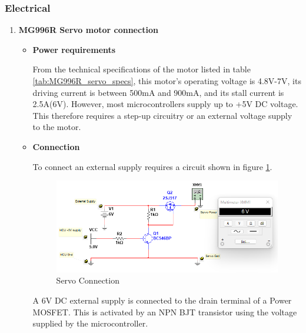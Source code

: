 \subsubsection{Electrical}
\begin{enumerate}
    \item \textbf{MG996R Servo motor connection}
    \par
    \begin{itemize}
        \item \textbf{Power requirements}
        \par
        From the technical specifications of the motor listed in table \ref{tab:MG996R_servo_specs}, this motor's operating voltage is 4.8V-7V, its driving current is between 500mA and 900mA, and its stall current is 2.5A(6V). However, most microcontrollers supply up to +5V DC voltage. This therefore requires a step-up circuitry or an external voltage supply to the  motor.
        \item \textbf{Connection}
        \par
        To connect an external supply requires a circuit shown in figure \ref{fig:servo_connection}.
        \begin{figure}[H]
            \centering
            \includegraphics[width=\textwidth]{Figures/ServoConnection.png}
            \caption{Servo Connection}
            \label{fig:servo_connection}
        \end{figure}
        A 6V DC external supply is connected to the drain terminal of a Power MOSFET. This is activated by an NPN BJT transistor using the voltage supplied by the microcontroller.
    \end{itemize}
    

\end{enumerate}
